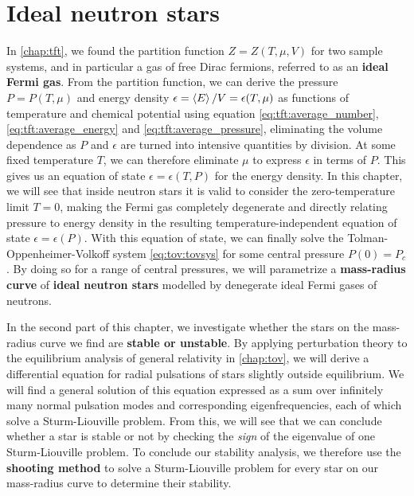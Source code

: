 \chapter{Ideal neutron stars}
\label{chap:nstars}

In \cref{chap:tft}, we found the partition function $Z = Z(T, \mu, V)$ for two sample systems, and in particular a gas of free Dirac fermions, referred to as an \textbf{ideal Fermi gas}.
From the partition function, we can derive the pressure $P = P(T, \mu)$ and energy density $\epsilon = \left< E \right>/V = \epsilon(T, \mu)$ as functions of temperature and chemical potential using equation \eqref{eq:tft:average_number}, \eqref{eq:tft:average_energy} and \eqref{eq:tft:average_pressure}, eliminating the volume dependence as $P$ and $\epsilon$ are turned into intensive quantities by division.
At some fixed temperature $T$, we can therefore eliminate $\mu$ to express $\epsilon$ in terms of $P$.
This gives us an equation of state $\epsilon = \epsilon(T, P)$ for the energy density.
In this chapter, we will see that inside neutron stars it is valid to consider the zero-temperature limit $T=0$, making the Fermi gas completely degenerate and directly relating pressure to energy density in the resulting temperature-independent equation of state $\epsilon = \epsilon(P)$.
With this equation of state, we can finally solve the Tolman-Oppenheimer-Volkoff system \eqref{eq:tov:tovsys} for some central pressure $P(0)=P_c$.
By doing so for a range of central pressures, we will parametrize a \textbf{mass-radius curve} of \textbf{ideal neutron stars} modelled by denegerate ideal Fermi gases of neutrons.

In the second part of this chapter, we investigate whether the stars on the mass-radius curve we find are \textbf{stable or unstable}.
By applying perturbation theory to the equilibrium analysis of general relativity in \cref{chap:tov}, we will derive a differential equation for radial pulsations of stars slightly outside equilibrium.
We will find a general solution of this equation expressed as a sum over infinitely many normal pulsation modes and corresponding eigenfrequencies, each of which solve a Sturm-Liouville problem.
From this, we will see that we can conclude whether a star is stable or not by checking the \emph{sign} of the eigenvalue of one Sturm-Liouville problem.
To conclude our stability analysis, we therefore use the \textbf{shooting method} to solve a Sturm-Liouville problem for every star on our mass-radius curve to determine their stability.

